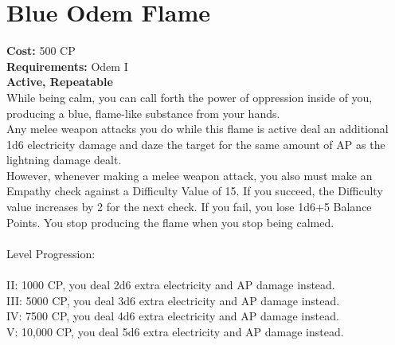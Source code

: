 \section{Blue Odem Flame}
\textbf{Cost:} 500 CP\\
\textbf{Requirements:} Odem I\\
\textbf{Active, Repeatable}\\
While being calm, you can call forth the power of oppression inside of you, producing a blue, flame-like substance from your hands.\\
Any melee weapon attacks you do while this flame is active deal an additional 1d6 electricity damage and daze the target for the same amount of AP as the lightning damage dealt.\\
However, whenever making a melee weapon attack, you also must make an Empathy check against a Difficulty Value of 15. If you succeed, the Difficulty value increases by 2 for the next check. If you fail, you lose 1d6+5 Balance Points. You stop producing the flame when you stop being calmed.\\ 
\\
Level Progression:\\
\\
II: 1000 CP, you deal 2d6 extra electricity and AP damage instead.\\
III: 5000 CP, you deal 3d6 extra electricity and AP damage instead.\\
IV: 7500 CP, you deal 4d6 extra electricity and AP damage instead.\\
V: 10,000 CP, you deal 5d6 extra electricity and AP damage instead.\\